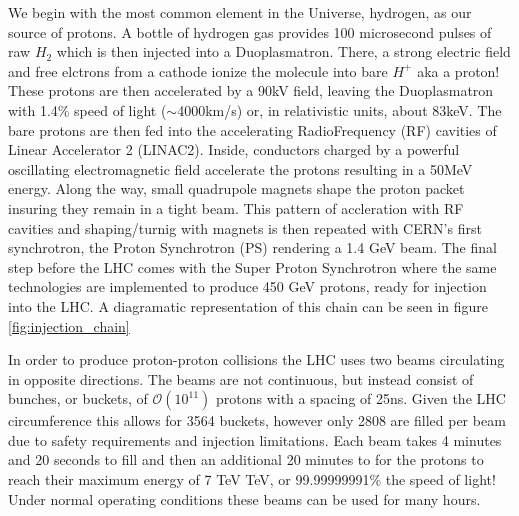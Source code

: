 We begin with the most common element in the Universe, hydrogen, as our source
of protons.  A bottle of hydrogen gas provides 100 microsecond pulses of raw
$H_{2}$ which is then injected into a Duoplasmatron. There,  a strong electric
field and free elctrons from a cathode ionize the molecule into bare $H^{+}$ aka
a proton!  These protons are then accelerated by a 90kV field, leaving the
Duoplasmatron with 1.4\% speed of light ($\sim$4000km/s) or, in relativistic
units, about 83keV. The bare protons are then fed into the accelerating
RadioFrequency (RF) cavities of Linear Accelerator 2 (LINAC2). Inside,
conductors charged by a powerful oscillating electromagnetic field accelerate
the protons resulting in a 50MeV energy. Along the way, small quadrupole magnets
shape the proton packet insuring they remain in a tight beam.  This pattern of
accleration with RF cavities and shaping/turnig with magnets is then repeated
with CERN's first synchrotron, the Proton Synchrotron (PS) rendering a 1.4 GeV
beam.  The final step before the LHC comes with the Super Proton Synchrotron
where the same technologies are implemented to produce 450 GeV protons, ready
for injection into the LHC. A diagramatic representation of this chain can be
seen in figure \ref{fig:injection_chain} 

In order to produce proton-proton collisions the LHC uses two beams circulating
in opposite directions.  The beams are not continuous, but instead consist of
bunches, or buckets, of $\mathcal{O}(10^{11})$ protons with a spacing of 25ns.
Given the LHC circumference this allows for 3564 buckets, however only 2808 are
filled per beam due to safety requirements and injection limitations.  Each beam
takes 4 minutes and 20 seconds to fill and then an additional 20 minutes to for
the protons to reach their maximum energy of 7 TeV TeV, or 99.99999991\% the
speed of light! Under normal operating conditions these beams can be used for
many hours.
